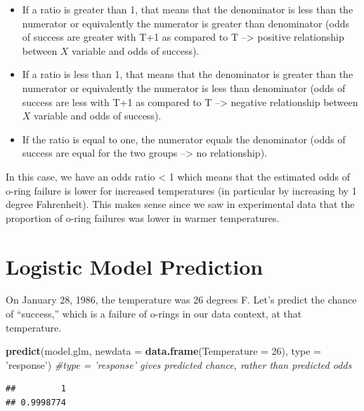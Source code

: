\documentclass[
]{book}
\newenvironment{Shaded}{\begin{snugshade}}{\end{snugshade}}
\newcommand{\CommentTok}[1]{\textcolor[rgb]{0.56,0.35,0.01}{\textit{#1}}}
\newcommand{\DataTypeTok}[1]{\textcolor[rgb]{0.13,0.29,0.53}{#1}}
\newcommand{\DecValTok}[1]{\textcolor[rgb]{0.00,0.00,0.81}{#1}}
\newcommand{\KeywordTok}[1]{\textcolor[rgb]{0.13,0.29,0.53}{\textbf{#1}}}
\newcommand{\NormalTok}[1]{#1}
\newcommand{\StringTok}[1]{\textcolor[rgb]{0.31,0.60,0.02}{#1}}
\begin{document}
\begin{itemize}
\item
  If a ratio is greater than 1, that means that the denominator is less than the numerator or equivalently the numerator is greater than denominator (odds of success are greater with T+1 as compared to T --\textgreater{} positive relationship between \(X\) variable and odds of success).
\item
  If a ratio is less than 1, that means that the denominator is greater than the numerator or equivalently the numerator is less than denominator (odds of success are less with T+1 as compared to T --\textgreater{} negative relationship between \(X\) variable and odds of success).
\item
  If the ratio is equal to one, the numerator equals the denominator (odds of success are equal for the two groups --\textgreater{} no relationship).
\end{itemize}

In this case, we have an odds ratio \textless{} 1 which means that the estimated odds of o-ring failure is lower for increased temperatures (in particular by increasing by 1 degree Fahrenheit). This makes sense since we saw in experimental data that the proportion of o-ring failures was lower in warmer temperatures.

\hypertarget{logistic-model-prediction}{%
\section{Logistic Model Prediction}\label{logistic-model-prediction}}

On January 28, 1986, the temperature was 26 degrees F. Let's predict the chance of ``success,'' which is a failure of o-rings in our data context, at that temperature.

\begin{Shaded}
\begin{Highlighting}[]
\KeywordTok{predict}\NormalTok{(model.glm, }\DataTypeTok{newdata =} \KeywordTok{data.frame}\NormalTok{(}\DataTypeTok{Temperature =} \DecValTok{26}\NormalTok{), }\DataTypeTok{type =} \StringTok{'response'}\NormalTok{) }\CommentTok{#type = 'response' gives predicted chance, rather than predicted odds}
\end{Highlighting}
\end{Shaded}

\begin{verbatim}
##         1 
## 0.9998774
\end{verbatim}
\end{document}
